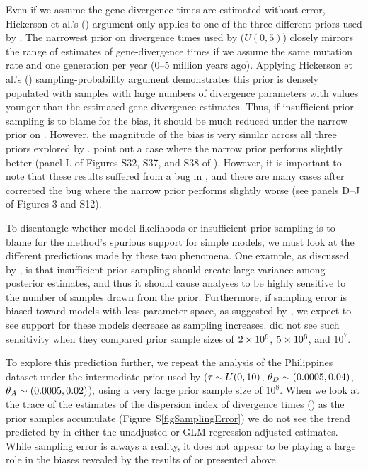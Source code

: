Even if we assume the gene divergence times are estimated without error,
Hickerson et al.'s (\citeyear{Hickerson2013}) argument only applies to one of
the three different priors used by \citet{Oaks2012}.
The narrowest prior on divergence times used by \citet{Oaks2012} ($U(0, 5)$)
closely mirrors the range of estimates of gene-divergence times if we assume
the same mutation rate and one generation per year (0--5 million years ago).
Applying Hickerson et al.'s (\citeyear{Hickerson2013}) sampling-probability
argument demonstrates this prior is densely populated with samples with large
numbers of divergence parameters with values younger than the estimated gene
divergence estimates.
Thus, if insufficient prior sampling is to blame for the bias, it should be
much reduced under the narrow prior on \divt{}.
However, the magnitude of the bias is very similar across all three priors
explored by \citet{Oaks2012}.
\citet{Hickerson2013} point out a case where the narrow prior performs
slightly better (panel L of Figures S32, S37, and S38 of \citet{Oaks2012}).
However, it is important to note that these results suffered from a bug
in \msb, and there are many cases after \citet{Oaks2012} corrected the 
bug where the narrow prior performs slightly worse (see panels D--J of
Figures 3 and S12).

To disentangle whether model likelihoods or insufficient prior sampling is to
blame for the method's spurious support for simple models, we must look at the
different predictions made by these two phenomena.
One example, as discussed by \citet{Oaks2012}, is that insufficient prior
sampling should create large variance among posterior estimates, and thus it
should cause analyses to be highly sensitive to the number of samples drawn
from the prior.
Furthermore, if sampling error is biased toward models with less
parameter space, as suggested by \citet{Hickerson2013}, we expect to see
support for these models decrease as sampling increases.
\citet{Oaks2012} did not see such sensitivity when they compared prior sample
sizes of $2\times 10^{6}$, $5\times 10^{6}$, and $10^7$.

To explore this prediction further, we repeat the analysis of the Philippines
dataset under the intermediate prior used by \citet{Oaks2012} ($\tau_{} \sim
U(0, 10)$, $\meanDescendantTheta{} \sim (0.0005, 0.04)$, $\ancestralTheta{}
\sim (0.0005, 0.02)$), using a very large prior sample size of $10^8$.
When we look at the trace of the estimates of the dispersion index of
divergence times (\vmratio{}) as the prior samples accumulate
(Figure~S\ref{figSamplingError}) we do not see the trend predicted by
\citet{Hickerson2013} in either the unadjusted or GLM-regression-adjusted
estimates.
While sampling error is always a reality, it does not appear to be playing a
large role in the biases revealed by the results of \citet{Oaks2012} or
presented above.

